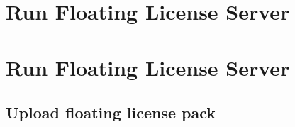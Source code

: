 \documentclass[12pt]{report}
\begin{document}
\chapter*{Run Floating License Server} \label{ch:run-fls}

\chapter*{Run Floating License Server} \label{ch:fls-commands}

\section*{Upload floating license pack} \label{sec:fls-commands-upload}
\end{document}
